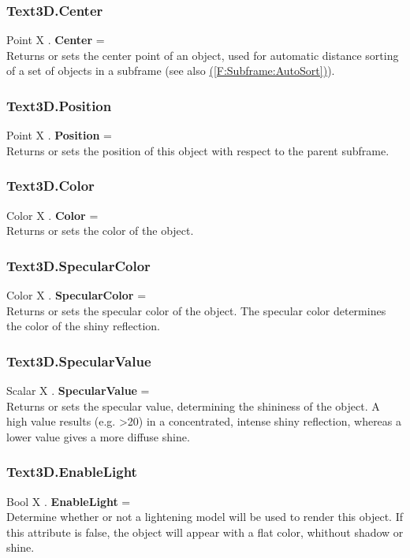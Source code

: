 \documentclass[10pt]{book}
\newcommand{\linkitem}[1]{\hyperref[#1]{\nameref{#1} (\ref{#1})}}
\begin{document}
\subsubsection{Text3D.Center \label{F:Text3D:Center}}
Point X . \textbf{Center} = \\
Returns or sets the center point of an object, used for automatic distance sorting of a set of objects in a subframe (see also \linkitem{F:Subframe:AutoSort}).

\subsubsection{Text3D.Position \label{F:Text3D:Position}}
Point X . \textbf{Position} = \\
Returns or sets the position of this object with respect to the parent subframe.

\subsubsection{Text3D.Color \label{F:Text3D:Color}}
Color X . \textbf{Color} = \\
Returns or sets the color of the object.

\subsubsection{Text3D.SpecularColor \label{F:Text3D:SpecularColor}}
Color X . \textbf{SpecularColor} = \\
Returns or sets the specular color of the object. The specular color determines the color of the shiny reflection.

\subsubsection{Text3D.SpecularValue \label{F:Text3D:SpecularValue}}
Scalar X . \textbf{SpecularValue} = \\
Returns or sets the specular value, determining the shininess of the object. A high value results (e.g. >20) in a concentrated, intense shiny reflection, whereas a lower value gives a more diffuse shine.

\subsubsection{Text3D.EnableLight \label{F:Text3D:EnableLight}}
Bool X . \textbf{EnableLight} = \\
Determine whether or not a lightening model will be used to render this object. If this attribute is false, the object will appear with a flat color, whithout shadow or shine.
\end{document}
